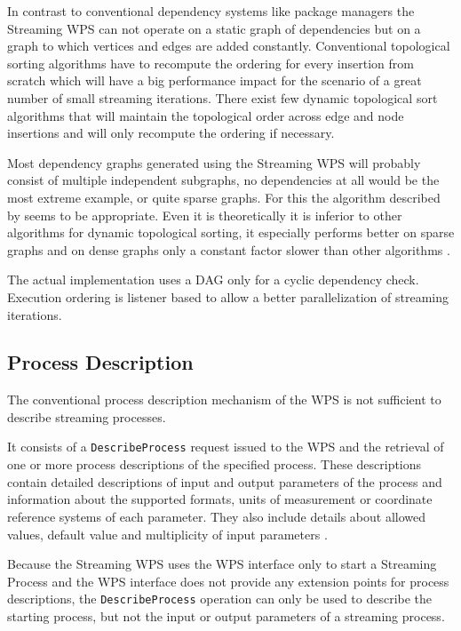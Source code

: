 		In contrast to conventional dependency systems like package managers the Streaming \ac{WPS} can not operate on a static graph of dependencies but on a graph to which vertices and edges are added constantly. Conventional topological sorting algorithms have to recompute the ordering for every insertion from scratch which will have a big performance impact for the scenario of a great number of small streaming iterations. There exist few dynamic topological sort algorithms that will maintain the topological order across edge and node insertions and will only recompute the ordering if necessary.

		Most dependency graphs generated using the Streaming \ac{WPS} will probably consist of multiple independent subgraphs, no dependencies at all would be the most extreme example, or quite sparse graphs. For this the algorithm described by \citet{pearce2007dynamic} seems to be appropriate. Even it is theoretically it is inferior to other algorithms for dynamic topological sorting, it especially performs better on sparse graphs and on dense graphs only a constant factor slower than other algorithms \citep{pearce2007dynamic}. %

		The actual implementation uses a \ac{DAG} only for a cyclic dependency check. Execution ordering is listener based to allow a better parallelization of streaming iterations.

	\subsection{Process Description}
		The conventional process description mechanism of the \ac{WPS} is not sufficient to describe streaming processes.

		It consists of a \texttt{DescribeProcess} request issued to the \ac{WPS} and the retrieval of one or more process descriptions of the specified process. These descriptions contain detailed descriptions of input and output parameters of the process and information about the supported formats, units of measurement or coordinate reference systems of each parameter. They also include details about allowed values, default value and multiplicity of input parameters \citep{ogc:wps}.

		Because the Streaming \ac{WPS} uses the \ac{WPS} interface only to start a Streaming Process and the \ac{WPS} interface does not provide any extension points for process descriptions, the \texttt{DescribeProcess} operation can only be used to describe the starting process, but not the input or output parameters of a streaming process.

